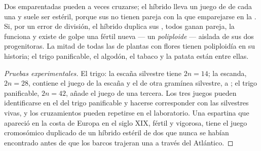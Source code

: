 \begin{proposition}\label{prop:g12:diversification-of-life:polyploidy}
Dos  emparentadas pueden a veces cruzarse; el híbrido lleva un
juego de  de cada una y suele ser estéril, porque sus
 no tienen pareja con la que emparejarse en la . Si,
por un error de división, el híbrido duplica sus , todos
ganan pareja, la  funciona y existe de golpe una  fértil
nueva --- un \emph{poliploide} --- aislada de sus
dos progenitoras. La mitad de todas las  de plantas con flores
tienen poliploidía en su historia; el trigo panificable, el algodón, el
tabaco y la patata están entre ellas.
\end{proposition}
\begin{proof}[Pruebas experimentales]
El trigo: la escaña silvestre tiene $2n = 14$; la escanda, $2n = 28$,
contiene el juego de la escaña y el de otra gramínea silvestre,
 a ; el trigo panificable, $2n = 42$, añade el juego
de una tercera. Los tres juegos pueden identificarse en el 
del trigo panificable y hacerse corresponder con las 
silvestres vivas, y los cruzamientos pueden repetirse en el
laboratorio. Una espartina que apareció en la costa de Europa en el
siglo XIX, fértil y vigorosa, tiene el juego cromosómico duplicado de
un híbrido estéril de dos  que nunca se habían encontrado antes
de que los barcos trajeran una a través del Atlántico.
\end{proof}

